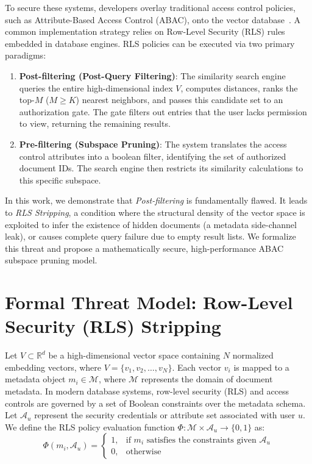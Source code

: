 \documentclass[sigconf]{acmart}
\begin{document}
To secure these systems, developers overlay traditional access control policies, such as Attribute-Based Access Control (ABAC), onto the vector database~\cite{hu2014guide}. A common implementation strategy relies on Row-Level Security (RLS) rules embedded in database engines. RLS policies can be executed via two primary paradigms:
\begin{enumerate}
    \item \textbf{Post-filtering (Post-Query Filtering)}: The similarity search engine queries the entire high-dimensional index $V$, computes distances, ranks the top-$M$ ($M \ge K$) nearest neighbors, and passes this candidate set to an authorization gate. The gate filters out entries that the user lacks permission to view, returning the remaining results.
    \item \textbf{Pre-filtering (Subspace Pruning)}: The system translates the access control attributes into a boolean filter, identifying the set of authorized document IDs. The search engine then restricts its similarity calculations to this specific subspace.
\end{enumerate}

In this work, we demonstrate that \textit{Post-filtering} is fundamentally flawed. It leads to \textit{RLS Stripping}, a condition where the structural density of the vector space is exploited to infer the existence of hidden documents (a metadata side-channel leak), or causes complete query failure due to empty result lists. We formalize this threat and propose a mathematically secure, high-performance ABAC subspace pruning model.

\section{Formal Threat Model: Row-Level Security (RLS) Stripping}
Let $V \subset \mathbb{R}^d$ be a high-dimensional vector space containing $N$ normalized embedding vectors, where $V = \{v_1, v_2, \dots, v_N\}$. Each vector $v_i$ is mapped to a metadata object $m_i \in \mathcal{M}$, where $\mathcal{M}$ represents the domain of document metadata. In modern database systems, row-level security (RLS) and access controls are governed by a set of Boolean constraints over the metadata schema. Let $\mathcal{A}_u$ represent the security credentials or attribute set associated with user $u$. We define the RLS policy evaluation function $\Phi: \mathcal{M} \times \mathcal{A}_u \rightarrow \{0, 1\}$ as:
\begin{equation}
    \Phi(m_i, \mathcal{A}_u) = \begin{cases} 
      1, & \text{if } m_i \text{ satisfies the constraints given } \mathcal{A}_u \\ 
      0, & \text{otherwise} 
    \end{cases}
\end{equation}
\end{document}
